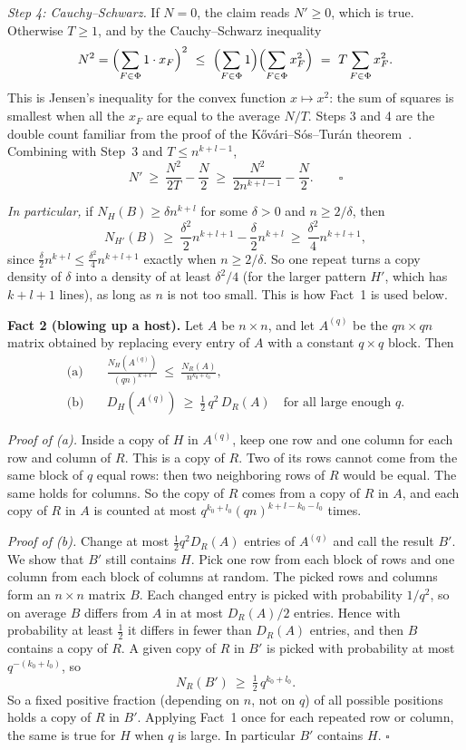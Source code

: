 \documentclass{article}
\theoremstyle{plain}
\theoremstyle{definition}
\begin{document}
\emph{Step 4: Cauchy--Schwarz.} If $N=0$, the claim reads $N'\ge0$, which is
true. Otherwise $T\ge1$, and by the Cauchy--Schwarz inequality
\[
 N^2=\Bigl(\sum_{F\in\Phi}1\cdot x_F\Bigr)^2
 \ \le\ \Bigl(\sum_{F\in\Phi}1\Bigr)\Bigl(\sum_{F\in\Phi}x_F^2\Bigr)
 \ =\ T\sum_{F\in\Phi}x_F^2 .
\]
This is Jensen's inequality for the convex function $x\mapsto x^2$: the sum of
squares is smallest when all the $x_F$ are equal to the average $N/T$. Steps 3
and 4 are the double count familiar from the proof of the
K\H{o}v\'ari--S\'os--Tur\'an theorem~\cite{KST}.
Combining with Step~3 and $T\le n^{k+l-1}$,
\[
 N'\ \ge\ \frac{N^2}{2T}-\frac N2\ \ge\ \frac{N^2}{2n^{k+l-1}}-\frac N2 .
 \qquad\square
\]

\emph{In particular,} if $N_H(B)\ge\delta n^{k+l}$ for some $\delta>0$ and
$n\ge2/\delta$, then
\[
 N_{H'}(B)\ \ge\ \frac{\delta^2}{2}n^{k+l+1}-\frac{\delta}{2}n^{k+l}
 \ \ge\ \frac{\delta^2}{4}n^{k+l+1},
\]
since $\frac{\delta}{2}n^{k+l}\le\frac{\delta^2}{4}n^{k+l+1}$ exactly when
$n\ge2/\delta$. So one repeat turns a copy density of $\delta$ into a density of
at least $\delta^2/4$ (for the larger pattern $H'$, which has $k+l+1$ lines),
as long as $n$ is not too small. This is how Fact~1 is used below.

\medskip
\textbf{Fact 2 (blowing up a host).}
Let $A$ be $n\times n$, and let $A^{(q)}$ be the $qn\times qn$ matrix obtained by replacing every entry of $A$
with a constant $q\times q$ block. Then
\begin{align*}
 \text{(a)}\quad & \frac{N_H(A^{(q)})}{(qn)^{k+l}}\ \le\ \frac{N_R(A)}{n^{k_0+l_0}},\\[2pt]
 \text{(b)}\quad & D_H(A^{(q)})\ \ge\ \tfrac12\,q^2\,D_R(A)\quad\text{for all large enough } q.
\end{align*}

\emph{Proof of (a).} Inside a copy of $H$ in $A^{(q)}$, keep one row and one column for each row and column of
$R$. This is a copy of $R$. Two of its rows cannot come from the same block of $q$ equal rows: then two
neighboring rows of $R$ would be equal. The same holds for columns. So the copy of $R$ comes from a copy of $R$
in $A$, and each copy of $R$ in $A$ is counted at most $q^{k_0+l_0}(qn)^{k+l-k_0-l_0}$ times.

\emph{Proof of (b).} Change at most $\frac12q^2D_R(A)$ entries of $A^{(q)}$ and call the result $B'$. We show
that $B'$ still contains $H$. Pick one row from each block of rows and one column from each block of columns
at random. The picked rows and columns form an $n\times n$ matrix $B$. Each changed entry is picked with
probability $1/q^2$, so on average $B$ differs from $A$ in at most $D_R(A)/2$ entries. Hence with probability
at least $\frac12$ it differs in fewer than $D_R(A)$ entries, and then $B$ contains a copy of $R$. A given
copy of $R$ in $B'$ is picked with probability at most $q^{-(k_0+l_0)}$, so
\[
 N_R(B')\ \ge\ \tfrac12\,q^{k_0+l_0}.
\]
So a fixed positive fraction (depending on $n$, not on $q$) of all possible positions holds a copy of $R$ in
$B'$. Applying Fact~1 once for each repeated row or column, the same is true for $H$ when $q$ is large. In
particular $B'$ contains $H$. $\square$
\end{document}
